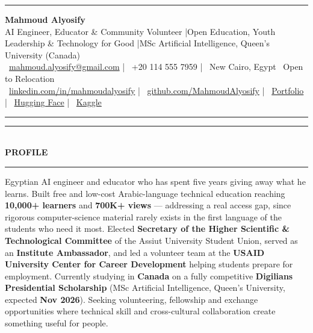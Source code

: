 \documentclass[10pt, a4paper]{article}
\newcommand{\faEnvelope}{}\newcommand{\faPhone}{}\newcommand{\faMapMarker}{}%
\newcommand{\faLinkedin}{}\newcommand{\faGithub}{}\newcommand{\faRobot}{}%
\newcommand{\faChartBar}{}\newcommand{\faGlobe}{}%
\newcommand{\cvsection}[1]{%
  \vspace{3pt}%
  {\color{navy}\rule{\linewidth}{1.1pt}}\\[0.5pt]%
  {\color{navy}\bfseries\fontsize{9.5}{11}\selectfont\uppercase{#1}}\\[-4pt]%
  {\color{teal}\rule{\linewidth}{0.6pt}}%
  \vspace{2pt}%
}
\begin{document}
\small

{\color{navy}\rule{\linewidth}{1.5pt}}

\vspace{3pt}
\begin{center}
  {\fontsize{21}{24}\bfseries\color{navy} Mahmoud Alyosify}\\[3pt]
  {\fontsize{10}{12}\color{teal}
    AI Engineer, Educator \& Community Volunteer \enspace|\enspace Open Education, Youth Leadership \& Technology for Good
    \enspace|\enspace MSc Artificial Intelligence, Queen's University (Canada)
}\\[4pt]
  {\color{midgray}
    \faEnvelope\ \href{mailto:mahmoud.alyosify@gmail.com}{mahmoud.alyosify@gmail.com}
    \enspace|\enspace
    \faPhone\ +20 114 555 7959
    \enspace|\enspace
    \faMapMarker\ New Cairo, Egypt \textperiodcentered\ Open to Relocation}\\[2pt]
  {\faLinkedin\ \href{https://linkedin.com/in/mahmoudalyosify}{linkedin.com/in/mahmoudalyosify}
    \enspace|\enspace
    \faGithub\ \href{https://github.com/MahmoudAlyosify}{github.com/MahmoudAlyosify}
    \enspace|\enspace
    \faGlobe\ \href{https://mahmoudalyosifysite.github.io/}{Portfolio}
    \enspace|\enspace
    \faRobot\ \href{https://huggingface.co/mahmoudalyosify}{Hugging Face}
    \enspace|\enspace
    \faChartBar\ \href{https://kaggle.com/mahmoudalyosify}{Kaggle}}
\end{center}

{\color{navy}\rule{\linewidth}{1.5pt}}

\vspace{2pt}

\cvsection{Profile}

{\color{darkgray}\justifying
Egyptian AI engineer and educator who has spent five years giving away what he learns. Built free and low-cost Arabic-language technical education reaching \textbf{10,000+ learners} and \textbf{700K+ views} --- addressing a real access gap, since rigorous computer-science material rarely exists in the first language of the students who need it most. Elected \textbf{Secretary of the Higher Scientific \& Technological Committee} of the Assiut University Student Union, served as an \textbf{Institute Ambassador}, and led a volunteer team at the \textbf{USAID University Center for Career Development} helping students prepare for employment. Currently studying in \textbf{Canada} on a fully competitive \textbf{Digilians Presidential Scholarship} (MSc Artificial Intelligence, Queen's University, expected \textbf{Nov 2026}). Seeking volunteering, fellowship and exchange opportunities where technical skill and cross-cultural collaboration create something useful for people.}
\end{document}
